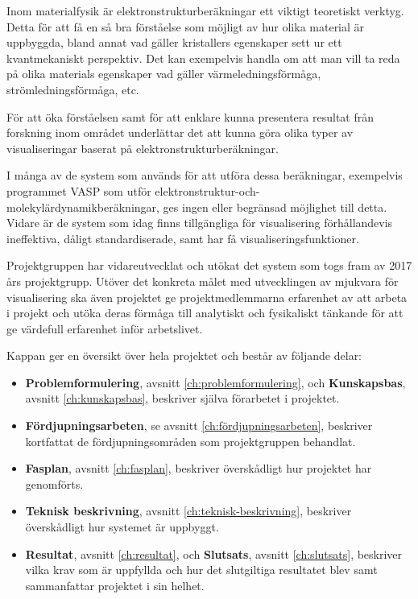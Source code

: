 \documentclass[a4paper,12pt]{article}
\begin{document}
Inom materialfysik är elektronstrukturberäkningar ett viktigt teoretiskt verktyg. Detta för att få en så bra förståelse som möjligt av hur olika material är uppbyggda, bland annat vad gäller kristallers egenskaper sett ur ett kvantmekaniskt perspektiv. Det kan exempelvis handla om att man vill ta reda på olika materials egenskaper vad gäller värmeledningsförmåga, strömledningsförmåga, etc.

För att öka förståelsen samt för att enklare kunna presentera resultat från forskning inom området underlättar det att kunna göra olika typer av visualiseringar baserat på elektronstrukturberäkningar.

I många av de system som används för att utföra dessa beräkningar, exempelvis programmet VASP som utför elektronstruktur-och-molekylärdynamikberäkningar, ges ingen eller begränsad möjlighet till detta. Vidare är de system som idag finns tillgängliga för visualisering förhållandevis ineffektiva, dåligt standardiserade, samt har få visualiseringsfunktioner.

Projektgruppen har vidareutvecklat och utökat det system som togs fram av 2017 års projektgrupp. Utöver det konkreta målet med utvecklingen av mjukvara för visualisering ska även projektet ge projektmedlemmarna erfarenhet av att arbeta i projekt och utöka deras förmåga till analytiskt och fysikaliskt tänkande för att ge värdefull erfarenhet inför arbetslivet.

Kappan ger en översikt över hela projektet och består av följande delar:

\begin{itemize}
	\item \textbf{Problemformulering}, avsnitt \ref{ch:problemformulering}, och \textbf{Kunskapsbas}, avsnitt \ref{ch:kunskapsbas}, beskriver själva förarbetet i projektet.
	
	\item \textbf{Fördjupningsarbeten}, se avsnitt \ref{ch:fördjupningsarbeten}, beskriver kortfattat de fördjupningsområden som projektgruppen behandlat.
	
	\item \textbf{Fasplan}, avsnitt \ref{ch:fasplan}, beskriver överskådligt hur projektet har genomförts.

	\item \textbf{Teknisk beskrivning}, avsnitt \ref{ch:teknisk-beskrivning}, beskriver överskådligt hur systemet är uppbyggt.
	
	\item \textbf{Resultat}, avsnitt \ref{ch:resultat}, och \textbf{Slutsats}, avsnitt \ref{ch:slutsats}, beskriver vilka krav som är uppfyllda och hur det slutgiltiga resultatet blev samt sammanfattar projektet i sin helhet.
\end{itemize}
\end{document}
